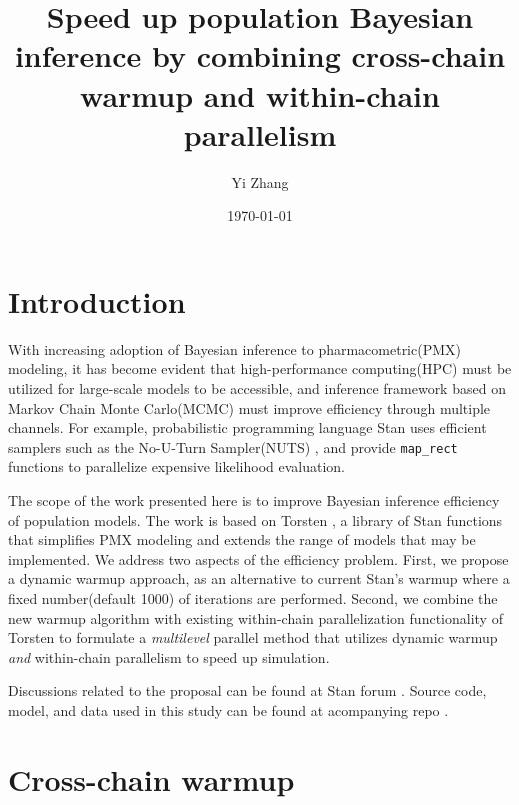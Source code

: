 \documentclass[11pt, reqno, oneside]{amsart}
\author{Yi Zhang}
\date{\today}
\title{Speed up population Bayesian inference by combining cross-chain warmup and within-chain parallelism}
\begin{document}
\maketitle

\section{Introduction}
\label{sec:orge05e8df}
With increasing adoption of Bayesian inference to
pharmacometric(PMX) modeling, it has become evident that
high-performance computing(HPC) must be utilized for large-scale
models to be accessible, and inference framework based on Markov Chain
Monte Carlo(MCMC) must improve efficiency through multiple
channels. For example, probabilistic programming language Stan \cite{carpenter_stan_2017}
uses efficient samplers such as the No-U-Turn
Sampler(NUTS) \cite{hoffman_no-u-turn_2014}, and provide \texttt{map_rect} functions
to parallelize expensive likelihood evaluation.

The scope of the work presented here is to improve Bayesian inference
efficiency of population models. The work is based on Torsten
\cite{Torsten}, a library of Stan functions that
simplifies PMX modeling and
extends the range of models that may be implemented. We address two
aspects of the efficiency problem. First, we propose a dynamic warmup
approach, as an alternative to current Stan's warmup where a fixed
number(default 1000) of iterations are performed. Second, we combine
the new warmup algorithm with existing within-chain parallelization
functionality of Torsten \cite{torsten_pmx_group} to formulate a \emph{multilevel} parallel method
that utilizes dynamic warmup \emph{and} within-chain parallelism to speed
up simulation.

Discussions related to the proposal can be found at Stan forum
\cite{cc_discusion,cc_mpi_discusion}. Source code, model, and data used
in this study can be found at acompanying repo \cite{cc_acop_repo}.

\section{Cross-chain warmup}
\label{sec:orgce1162e}
\end{document}
